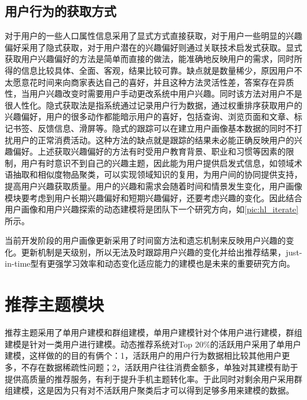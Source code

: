   \subsection{用户行为的获取方式}
  对于用户的一些人口属性信息采用了显式方式直接获取，对于用户一些明显的兴趣偏好采用了隐式获取，对于用户潜在的兴趣偏好则通过关联技术启发式获取。显式获取用户兴趣偏好的方法是简单而直接的做法，能准确地反映用户的需求，同时所得的信息比较具体、全面、客观，结果比较可靠。缺点就是数量稀少，原因用户不太愿意花时间来向商家表达自己的喜好，并且这种方法灵活性差，答案存在异质性，当用户兴趣改变时需要用户手动更改系统中用户兴趣。同时该方法对用户不是很人性化。隐式获取法是指系统通过记录用户行为数据，通过权重排序获取用户的兴趣偏好，用户的很多动作都能暗示用户的喜好，包括查询、浏览页面和文章、标记书签、反馈信息、滑屏等。隐式的跟踪可以在建立用户画像基本数据的同时不打扰用户的正常消费活动。这种方法的缺点就是跟踪的结果未必能正确反映用户的兴趣偏好。上述获取兴趣偏好的方法有时受用户教育背景、职业和习惯等因素的限制，用户有时意识不到自己的兴趣主题，因此能为用户提供启发式信息，如领域术语抽取和相似度物品聚类，可以实现领域知识的复用，为用户间的协同提供支持，提高用户兴趣获取质量。用户的兴趣和需求会随着时间和情景发生变化，用户画像模块要考虑到用户长期兴趣偏好和短期兴趣偏好，还要考虑兴趣的变化。因此结合用户画像和用户兴趣探索的动态建模将是团队下一个研究方向，如\autoref{pic:hl_iterate}所示。
  \begin{figure}
    \centering
      \label{pic:hl_iterate}
  \end{figure}

  当前开发阶段的用户画像更新采用了时间窗方法和遗忘机制来反映用户兴趣的变化。更新机制是天级别，所以无法及时跟踪用户兴趣的变化并给出推荐结果，just-in-time型有更强学习效率和动态变化适应能力的建模也是未来的重要研究方向。 

  \section{推荐主题模块}
  推荐主题采用了单用户建模和群组建模，单用户建模针对个体用户进行建模，群组建模是针对一类用户进行建模。动态推荐系统对Top 20\%的活跃用户采用了单用户建模，这样做的的目的有俩个：1，活跃用户的用户行为数据相比较其他用户更多，不存在数据稀疏性问题；2，活跃用户往往消费金额多，单独对其建模有助于提供高质量的推荐服务，有利于提升手机主题转化率。于此同时对剩余用户采用群组建模，这是因为只有对不活跃用户聚类后才可以得到足够多用来建模的数据。

